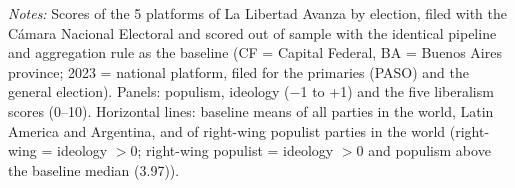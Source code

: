 \par\smallskip\begin{minipage}{\linewidth}\scriptsize\textit{Notes:} Scores of the 5 platforms of La Libertad Avanza by election, filed with the C\'amara Nacional Electoral and scored out of sample with the identical pipeline and aggregation rule as the baseline (CF = Capital Federal, BA = Buenos Aires province; 2023 = national platform, filed for the primaries (PASO) and the general election). Panels: populism, ideology ($-$1 to +1) and the five liberalism scores (0--10). Horizontal lines: baseline means of all parties in the world, Latin America and Argentina, and of right-wing populist parties in the world (right-wing = ideology $> 0$; right-wing populist = ideology $> 0$ and populism above the baseline median (3.97)).\end{minipage}
